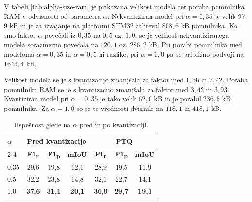 \documentclass[a4paper,twoside,openright,12pt,slovene]{book}
\begin{document}
            V tabeli \ref{tab:alpha-size-ram}
            je
            prikazana velikost modela ter poraba pomnilnika RAM v odvisnosti od
            parametra $\alpha$.
            Nekvantiziran model pri $\alpha=0{,}35$ je velik 97${,}$9 kB in je
            za izvajanje na platformi STM32 zahteval 808${,}$6 kB pomnilnika.
            Ko smo faktor $\alpha$ povečali iz $0{,}35$ na $0{,}5$ oz. $1{,}0$,
            se je velikost nekvantiziranega modela sorazmerno povečala na
            $120{,}1$ oz. $286{,}2$ kB.
            Pri porabi pomnilnika med modeloma $\alpha=0{,}35$ in
            $\alpha=0{,}5$ ni razlike, pri $\alpha=1{,}0$ pa se približno
            podvoji na $1643{,}4$ kB.

            Velikost modela se je s kvantizacijo zmanjšala za faktor med
            $1{,}56$ in $2{,}42$.
            Poraba pomnilnika RAM se je s kvantizacijo zmanjšala za faktor med
            $3{,}42$ in $3{,}93$. Kvantiziran model pri $\alpha=0{,}35$ je tako
            velik $62{,}6$ kB in je porabil $236{,}5$ kB pomnilnika. Za
            $\alpha=1{,}0$ so se te vrednosti dvignile na $118{,}1$ in
            $418{,}1$ kB.

            \begin{table}[t]
                \centering
                \begin{tabular}{|l|ccc|ccc|}
                    \toprule
                    \multirow{2}{*}{\textbf{$\alpha$}} & \multicolumn{3}{c|}{\textbf{Pred kvantizacijo}} & \multicolumn{3}{c|}{\textbf{PTQ}} \\
                    \cline{2-4}\cline{5-7}
                    & \textbf{F1\textsubscript{r}} & \textbf{F1\textsubscript{p}} & \textbf{mIoU} & \textbf{F1\textsubscript{r}} & \textbf{F1\textsubscript{p}} & \textbf{mIoU} \\
                    \midrule
                    0{,}35 & 29{,}6 & 19{,}8 & 12{,}1 & 28{,}9 & 19{,}5 & 11{,}9 \\
                    0{,}5  & 32{,}2 & 23{,}8 & 14{,}8 & 32{,}1 & 22{,}7 & 14{,}1 \\
                    1{,}0  & \textbf{37{,}6} & \textbf{31{,}1} & \textbf{20{,}1} & \textbf{36{,}9} & \textbf{29{,}7} & \textbf{19{,}1} \\
                    \bottomrule
                \end{tabular}
                \caption{Uspešnost glede na \(\alpha\) pred in po kvantizaciji.}
                \label{tab:alpha-perf-ptq}
            \end{table}
            
\end{document}
